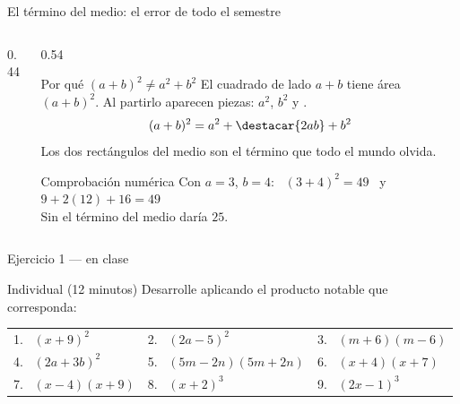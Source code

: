 \documentclass[aspectratio=169,10pt]{beamer}
\begin{document}
\begin{frame}{El término del medio: el error de todo el semestre}
  \scriptsize
  \begin{columns}[T,onlytextwidth]
    \begin{column}{0.44\textwidth}
      \centering
    \end{column}
    \begin{column}{0.54\textwidth}
      \begin{alertblock}{Por qué $(a+b)^{2}\neq a^{2}+b^{2}$}
        \tiny
        El cuadrado de lado $a+b$ tiene área $(a+b)^2$. Al partirlo aparecen
         piezas: $a^2$, $b^2$ y .
        \[ (a+b)^{2} = a^{2}+\destacar{2ab}+b^{2} \]
        Los dos rectángulos del medio son el término que todo el mundo olvida.
      \end{alertblock}
      \begin{exampleblock}{Comprobación numérica}
        \tiny
        Con $a=3$, $b=4$: \ $(3+4)^2 = 49$ \ y \
        $9 + 2(12) + 16 = 49$ \checkmark \\
        Sin el término del medio daría $25$.
      \end{exampleblock}
    \end{column}
  \end{columns}
\end{frame}

\begin{frame}{Ejercicio 1 — en clase}
  \begin{alertblock}{Individual (12 minutos)}
    \scriptsize
    Desarrolle aplicando el producto notable que corresponda:

    \vspace{0.25cm}
    \centering
    \begin{tabular}{@{}lll@{}}
      1. \ $(x+9)^{2}$ &
      2. \ $(2a-5)^{2}$ &
      3. \ $(m+6)(m-6)$ \\[0.9em]
      4. \ $(2a+3b)^{2}$ &
      5. \ $(5m-2n)(5m+2n)$ &
      6. \ $(x+4)(x+7)$ \\[0.9em]
      7. \ $(x-4)(x+9)$ &
      8. \ $(x+2)^{3}$ &
      9. \ $(2x-1)^{3}$ \\
    \end{tabular}
  \end{alertblock}
\end{frame}
\end{document}
